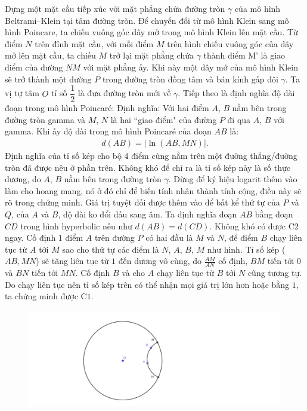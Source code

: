 \begin{multicols}{2}
\begin{figure}[H]
		\vspace*{-10pt}
	\end{figure}
	Dựng một mặt cầu tiếp xúc với mặt phẳng chứa đường tròn $\gamma$ của mô hình Beltrami--Klein tại tâm đường tròn. Để chuyển đổi từ mô hình Klein sang mô hình Poincare, ta chiếu vuông góc dây mở trong mô hình Klein lên mặt cầu. Từ điểm $N$ trên đỉnh mặt cầu, với mỗi điểm $M$ trên hình chiếu vuông góc của dây mở lên mặt cầu, ta chiếu $M$ trở lại mặt phẳng chứa $\gamma$ thành điểm M' là giao điểm của đường $NM$ với mặt phẳng ấy. Khi này một dây mở của mô hình Klein sẽ trở thành một đường $P$ trong đường tròn đồng tâm và bán kính gấp đôi $\gamma$. Ta vị tự tâm $O$ tỉ số $\dfrac{1}{2}$ là đưa đường tròn mới về $\gamma$.
	\vskip 0.1cm
	Tiếp theo là định nghĩa độ dài đoạn trong mô hình Poincaré:
	\vskip 0.1cm
	Định nghĩa: Với hai điểm $A$, $B$ nằm bên trong đường tròn gamma và $M$, $N$ là hai ``giao điểm" của đường $P$ đi qua $A$, $B$ với gamma. Khi ấy độ dài trong mô hình Poincaré của đoạn $AB$ là:
	\begin{align*}
		 d(AB) = |\ln{(AB, MN)}|.
	\end{align*} 
	Định nghĩa của tỉ số kép cho bộ $4$ điểm cùng nằm trên một đường thẳng/đường tròn đã được nêu ở phần trên. Không khó để chỉ ra là tỉ số kép này là số thực dương, do $A$, $B$ nằm bên trong đường tròn $\gamma$. Đừng để ký hiệu logarit thêm vào làm cho hoang mang, nó ở đó chỉ để biến tính nhân thành tính cộng, điều này sẽ rõ trong chứng minh. Giá trị tuyệt đối được thêm vào để bất kể thứ tự của $P$ và $Q$, của $A$ và $B$, độ dài ko đổi dấu sang âm.
	\vskip 0.1cm
	Ta định nghĩa đoạn $AB$ bằng đoạn $CD$ trong hình hyperbolic nếu như $d(AB) = d(CD)$. Không khó có được C$2$ ngay. 
	Cố định $1$ điểm $A$ trên đường $P$ có hai đầu là $M$ và $N$, để điểm $B$ chạy liên tục từ $A$ tới $M$ sao cho thứ tự các điểm là $N$, $A$, $B$, $M$ như hình. Tỉ số kép ($AB, MN$) sẽ tăng liên tục từ $1$ đến dương vô cùng, do $\frac{AM}{AN}$ cố định, $BM$ tiến tới $0$ và $BN$ tiến tới $MN$. Cố định $B$ và cho $A$ chạy liên tục từ $B$ tới $N$ cũng tương tự. Do chạy liên tục nên tỉ số kép trên có thể nhận mọi giá trị lớn hơn hoặc bằng $1$, ta chứng minh được C$1$. 
	\begin{figure}[H]
		\vspace*{-5pt}
		\centering
		\captionsetup{labelformat= empty, justification=centering}
		\includegraphics[width= 1\linewidth]{Tiên đề NTĐQ 1.pdf}

\end{figure}
\end{multicols}
